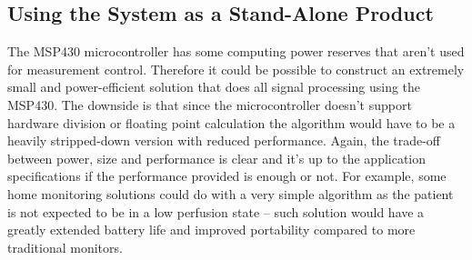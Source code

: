 \subsection{Using the System as a Stand-Alone Product}

The MSP430 microcontroller has some computing power reserves that aren't used for measurement control. Therefore it could be possible to construct an extremely small and power-efficient solution that does all signal processing using the MSP430. The downside is that since the microcontroller doesn't support hardware division or floating point calculation the algorithm would have to be a heavily stripped-down version with reduced performance. Again, the trade-off between power, size and performance is clear and it's up to the application specifications if the performance provided is enough or not. For example, some home monitoring solutions could do with a very simple algorithm as the patient is not expected to be in a low perfusion state -- such solution would have a greatly extended battery life and improved portability compared to more traditional monitors.
